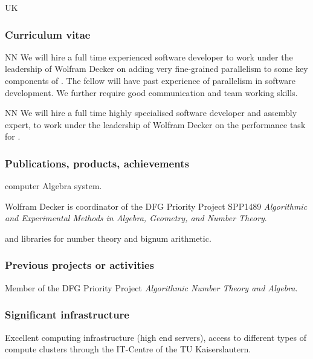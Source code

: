 \begin{sitedescription}{UK}
\subsubsection*{Curriculum vitae}


%

\begin{participant}[type=res,PM=48]{NN}
We will hire a full time experienced software developer to work
  under the leadership of Wolfram Decker on adding very fine-grained 
  parallelism to some key components of \Singular. The fellow
  will have past experience of parallelism in software development.
  We further require good communication and team working
  skills.
\end{participant}

\begin{participant}[type=res,PM=12]{NN}
  We will hire a full time highly specialised software developer and
  assembly expert, to work under the leadership of Wolfram Decker on the
  performance task  for \MPIR.
\end{participant}

\subsubsection*{Publications, products, achievements}

\begin{compactenum}
\item \Singular computer Algebra system.
\item Wolfram Decker is coordinator of the DFG Priority Project SPP1489 \emph{Algorithmic and Experimental Methods in Algebra, Geometry, and
Number Theory}.
\item {} and \MPIR {} libraries for number theory and bignum arithmetic.
\end{compactenum}

\subsubsection*{Previous projects or activities}

\begin{compactenum}
\item Member of the DFG Priority Project \emph{Algorithmic Number Theory and Algebra}.
\end{compactenum}

\subsubsection*{Significant infrastructure}

Excellent computing infrastructure (high end servers), access to 
different types of compute clusters through the IT-Centre of the 
TU Kaiserslautern.
\end{sitedescription}







